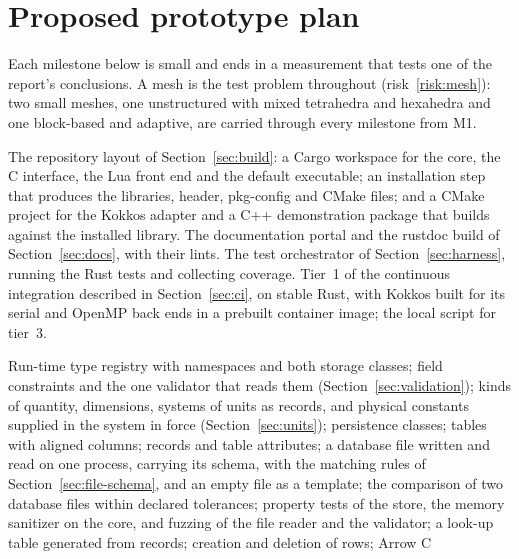 \documentclass[11pt,a4paper]{article}
\begin{document}
\section{Proposed prototype plan}
\label{sec:roadmap}

Each milestone below is small and ends in a measurement that tests one of the
report's conclusions.  A mesh is the test problem throughout
(risk~\ref{risk:mesh}): two small meshes, one unstructured with mixed
tetrahedra and hexahedra and one block-based and adaptive, are carried
through every milestone from M1.

\begin{description}[style=nextline,leftmargin=2em]
  \item[M0. Workspace.]
        The repository layout of Section~\ref{sec:build}: a Cargo workspace
        for the core, the C interface, the Lua front end and the default
        executable; an installation step that produces the libraries, header,
        pkg-config and CMake files; and a CMake project for the Kokkos
        adapter and a C++ demonstration package that builds against the
        installed library.  The documentation portal and the rustdoc build of
        Section~\ref{sec:docs}, with their lints.  The test orchestrator of
        Section~\ref{sec:harness}, running the Rust tests and collecting
        coverage.  Tier~1 of the continuous
        integration described in Section~\ref{sec:ci}, on stable Rust, with Kokkos built for its
        serial and OpenMP back ends in a prebuilt container image; the
        local script for tier~3.
  \item[M1. Schema and store, host only.]
        Run-time type registry with namespaces and both storage classes;
        field constraints and the one validator that reads them
        (Section~\ref{sec:validation}); kinds of quantity, dimensions,
        systems of units as records, and physical constants supplied in the
        system in force (Section~\ref{sec:units});
        persistence classes; tables with aligned columns; records and table
        attributes; a database file written and read on one process,
        carrying its schema, with the matching rules of
        Section~\ref{sec:file-schema}, and an empty file as a template; the
        comparison of two database files within declared tolerances;
        property tests of the store, the memory sanitizer on the core, and
        fuzzing of the file reader and the validator; a
        look-up
        table generated from records; creation and deletion of rows; Arrow C

\end{description}
\end{document}
